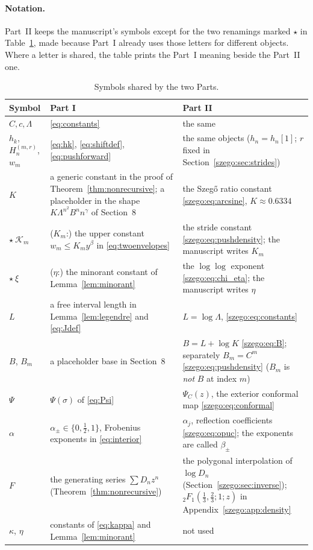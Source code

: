 \documentclass[11pt,a4paper]{article}
\numberwithin{equation}{section}
\theoremstyle{remark}\newtheorem{remark}[theorem]{Remark}
\begin{document}
\paragraph{Notation.} Part~II keeps the manuscript's symbols except for the
two renamings marked $\star$ in Table~\ref{szego:tab:notation}, made because
Part~I already uses those letters for different objects. Where a letter is
shared, the table prints the Part~I meaning beside the Part~II one.

\begin{table}[htbp]
\centering\small
\caption{Symbols shared by the two Parts.}\label{szego:tab:notation}
\begin{tabular}{>{\raggedright\arraybackslash}p{}>{\raggedright\arraybackslash}p{}>{\raggedright\arraybackslash}p{}}
\toprule
Symbol & Part I & Part II\\
\midrule
$C,c,\Lambda$ & \eqref{eq:constants} & the same\\
$h_k$, $H_n^{(m,r)}$, $w_m$ & \eqref{eq:hk}, \eqref{eq:shiftdef}, \eqref{eq:pushforward} & the same objects ($h_n=h_n[1]$; $r$ fixed in Section~\ref{szego:sec:strides})\\
$K$ & a generic constant in the proof of Theorem~\ref{thm:nonrecursive}; a placeholder in the shape $K\Lambda^{n^2}B^nn^\gamma$ of Section~8 & the Szeg\H{o} ratio constant \eqref{szego:eq:arcsine}, $K\approx0.6334$\\
$\star\ \mathcal K_m$ & ($K_m$:) the upper constant $w_m\leq K_my^\beta$ in \eqref{eq:twoenvelopes} & the stride constant \eqref{szego:eq:pushdensity}; the manuscript writes $K_m$\\
$\star\ \xi$ & ($\eta$:) the minorant constant of Lemma~\ref{lem:minorant} & the $\log\log$ exponent \eqref{szego:eq:chi_eta}; the manuscript writes $\eta$\\
$L$ & a free interval length in Lemma~\ref{lem:legendre} and \eqref{eq:Jdef} & $L=\log\Lambda$, \eqref{szego:eq:constants}\\
$B$, $B_m$ & a placeholder base in Section~8 & $B=L+\log K$ \eqref{szego:eq:B}; separately $B_m=C^m$ \eqref{szego:eq:pushdensity} ($B_m$ is \emph{not} $B$ at index $m$)\\
$\Psi$ & $\Psi(\sigma)$ of \eqref{eq:Psi} & $\Psi_C(z)$, the exterior conformal map \eqref{szego:eq:conformal}\\
$\alpha$ & $\alpha_\pm\in\{0,\frac12,1\}$, Frobenius exponents in \eqref{eq:interior} & $\alpha_j$, reflection coefficients \eqref{szego:eq:opuc}; the exponents are called $\beta_\pm$\\
$F$ & the generating series $\sum D_nz^n$ (Theorem~\ref{thm:nonrecursive}) & the polygonal interpolation of $\log D_n$ (Section~\ref{szego:sec:inverse}); ${}_2F_1(\frac13,\frac23;1;z)$ in Appendix~\ref{szego:app:density}\\
$\kappa$, $\eta$ & constants of \eqref{eq:kappa} and Lemma~\ref{lem:minorant} & not used\\
\bottomrule
\end{tabular}
\end{table}
\end{document}
